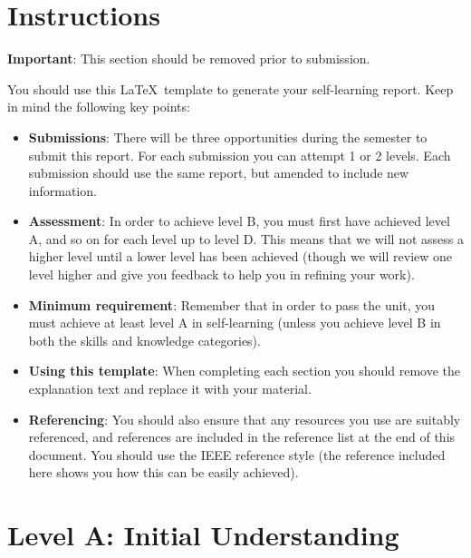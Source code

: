 \documentclass[a4paper, 11pt]{report}
\begin{document}

\tableofcontents


\newpage
\section*{Instructions}

\textbf{Important}: This section should be removed prior to submission.

You should use this \LaTeX\ template to generate your self-learning report. Keep in mind the following key points:
\begin{itemize}
	\item \textbf{Submissions}: There will be three opportunities during the semester to submit this report. For each submission you can attempt 1 or 2 levels. Each submission should use the same report, but amended to include new information.
	\item \textbf{Assessment}: In order to achieve level B, you must first have achieved level A, and so on for each level up to level D. This means that we will not assess a higher level until a lower level has been achieved (though we will review one level higher and give you feedback to help you in refining your work).
	\item \textbf{Minimum requirement}: Remember that in order to pass the unit, you must achieve at least level A in self-learning (unless you achieve level B in both the skills and knowledge categories).
	\item \textbf{Using this template}: When completing each section you should remove the explanation text and replace it with your material.
	\item \textbf{Referencing}: You should also ensure that any resources you use are suitably referenced, and references are included in the reference list at the end of this document. You should use the IEEE reference style \cite{usyd2} (the reference included here shows you how this can be easily achieved).
\end{itemize}




\newpage
\section{Level A: Initial Understanding}
\vspace{5mm}
\end{document}
